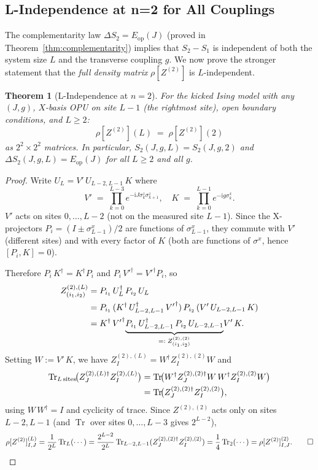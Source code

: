 \documentclass[12pt,a4paper]{article}
\newtheorem{theorem}{Theorem}[section]
\begin{document}
\subsection{L-Independence at n=2 for All Couplings}

The complementarity law $\Delta S_2 = E_\mathrm{op}(J)$ (proved in
Theorem~\ref{thm:complementarity}) implies that $S_2-S_1$ is independent of both
the system size $L$ and the transverse coupling $g$.  We now prove the stronger
statement that the \emph{full density matrix} $\rho[Z^{(2)}]$ is $L$-independent.

\begin{theorem}[L-Independence at $n=2$]\label{thm:L_indep_n2}
For the kicked Ising model with any $(J,g)$, $X$-basis OPU on site $L-1$ (the
rightmost site), open boundary conditions, and $L\ge 2$:
\begin{equation}
  \rho[Z^{(2)}](L) \;=\; \rho[Z^{(2)}](2)
\end{equation}
as $2^2\times 2^2$ matrices.  In particular, $S_2(J,g,L) = S_2(J,g,2)$ and
$\Delta S_2(J,g,L) = E_\mathrm{op}(J)$ for all $L\ge 2$ and all $g$.
\end{theorem}

\begin{proof}
Write $U_L = V'\,U_{L-2,L-1}\,K$ where
\[
  V' \;=\;\prod_{k=0}^{L-3} e^{-\mathrm{i}J\sigma^z_k\sigma^z_{k+1}},
  \quad
  K \;=\;\prod_{k=0}^{L-1} e^{-\mathrm{i}g\sigma^x_k}.
\]
$V'$ acts on sites $0,\ldots,L-2$ (not on the measured site $L-1$).  Since the
X-projectors $P_i = (I\pm\sigma^x_{L-1})/2$ are functions of $\sigma^x_{L-1}$,
they commute with $V'$ (different sites) and with every factor of $K$ (both are
functions of $\sigma^x$, hence $[P_i, K] = 0$).

Therefore $P_i\,K^\dagger = K^\dagger P_i$ and $P_i\,{V'}^\dagger = {V'}^\dagger P_i$, so
\begin{align}
  Z^{(2),(L)}_{(i_1,i_2)}
  &= P_{i_1}\,U_L^\dagger\,P_{i_2}\,U_L \notag\\
  &= P_{i_1}\,(K^\dagger\,U_{L-2,L-1}^\dagger\,{V'}^\dagger)\,P_{i_2}\,(V'\,U_{L-2,L-1}\,K) \notag\\
  &= K^\dagger\,{V'}^\dagger\!\underbrace{P_{i_1}\,U_{L-2,L-1}^\dagger\,P_{i_2}\,U_{L-2,L-1}}_{=:\;Z^{(2),(2)}_{(i_1,i_2)}}\!V'\,K.
\end{align}
Setting $W := V'\,K$, we have $Z^{(2),(L)}_I = W^\dagger Z^{(2),(2)}_I W$ and
\begin{align}
  \operatorname{Tr}_{L\,\text{sites}}\!\bigl(Z^{(2),(L)\dagger}_J Z^{(2),(L)}_I\bigr)
  &= \operatorname{Tr}\!\bigl(W^\dagger Z^{(2),(2)\dagger}_J W\,W^\dagger Z^{(2),(2)}_I W\bigr) \notag\\
  &= \operatorname{Tr}\!\bigl(Z^{(2),(2)\dagger}_J Z^{(2),(2)}_I\bigr),
\end{align}
using $W\,W^\dagger = I$ and cyclicity of trace.  Since $Z^{(2),(2)}$ acts only on
sites $L-2,L-1$ (and $\operatorname{Tr}$ over sites $0,\ldots,L-3$ gives $2^{L-2}$),
\[
  \rho[Z^{(2)}]^{(L)}_{I,J}
  = \frac{1}{2^L}\operatorname{Tr}_L(\cdots)
  = \frac{2^{L-2}}{2^L}\operatorname{Tr}_{L-2,L-1}(Z^{(2),(2)\dagger}_J Z^{(2),(2)}_I)
  = \frac{1}{4}\operatorname{Tr}_2(\cdots)
  = \rho[Z^{(2)}]^{(2)}_{I,J}.\qed
\]
\end{proof}
\end{document}
